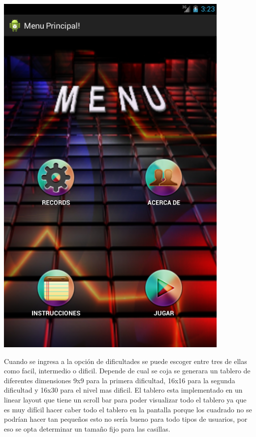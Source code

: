 \begin{center}
\includegraphics{image_buscamina/pantallaMenu}


\end{center}


Cuando se ingresa a la opción de dificultades se puede escoger entre tres de ellas como facil, intermedio o dificil. Depende de cual se coja se generara un tablero de diferentes dimensiones 9x9 para la primera dificultad, 16x16 para la segunda dificultad y 16x30 para el nivel mas dificil. El tablero esta implementado en un linear layout que tiene un scroll bar para poder visualizar todo el tablero ya que es muy difícil hacer caber todo el tablero en la pantalla porque los cuadrado no se podrían hacer tan pequeños esto no sería bueno para todo tipos de usuarios, por eso se opta determinar un tamaño fijo para las casillas.

